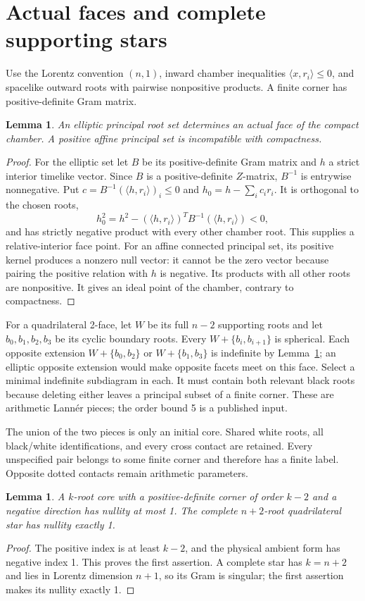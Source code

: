 \documentclass[11pt]{article}
\newtheorem{lemma}[theorem]{Lemma}
\begin{document}
\section{Actual faces and complete supporting stars}
Use the Lorentz convention $(n,1)$, inward chamber inequalities
$\langle x,r_i\rangle\le 0$, and spacelike outward roots with pairwise
nonpositive products. A finite corner has positive-definite Gram matrix.
\begin{lemma}\label{lem:face}
An elliptic principal root set determines an actual face of the compact
chamber. A positive affine principal set is incompatible with compactness.
\end{lemma}
\begin{proof}
For the elliptic set let $B$ be its positive-definite Gram matrix and $h$
a strict interior timelike vector. Since $B$ is a positive-definite
$Z$-matrix, $B^{-1}$ is entrywise nonnegative. Put
$c=B^{-1}(\langle h,r_i\rangle)_i\le 0$ and
$h_0=h-\sum_i c_i r_i$. It is orthogonal to the chosen roots,
\[
 h_0^2=h^2-(\langle h,r_i\rangle)^TB^{-1}
 (\langle h,r_i\rangle)<0,
\]
and has strictly negative product with every other chamber root. This
supplies a relative-interior face point. For an affine connected principal
set, its positive kernel produces a nonzero null vector: it cannot be the
zero vector because pairing the positive relation with $h$ is negative.
Its products with all other roots are nonpositive. It gives an ideal point
of the chamber, contrary to compactness.
\end{proof}

For a quadrilateral 2-face, let $W$ be its full $n-2$ supporting roots and
let $b_0,b_1,b_2,b_3$ be its cyclic boundary roots. Every
$W+\{b_i,b_{i+1}\}$ is spherical. Each opposite extension
$W+\{b_0,b_2\}$ or $W+\{b_1,b_3\}$ is indefinite by
Lemma~\ref{lem:face}; an elliptic opposite extension would make opposite
facets meet on this face. Select a minimal indefinite subdiagram in each.
It must contain both relevant black roots because deleting either leaves
a principal subset of a finite corner. These are arithmetic Lann\'er
pieces; the order bound 5 is a published input.

The union of the two pieces is only an initial core. Shared white roots,
all black/white identifications, and every cross contact are retained.
Every unspecified pair belongs to some finite corner and therefore has a
finite label. Opposite dotted contacts remain arithmetic parameters.

\begin{lemma}\label{lem:rank}
A $k$-root core with a positive-definite corner of order $k-2$ and a
negative direction has nullity at most 1. The complete $n+2$-root
quadrilateral star has nullity exactly 1.
\end{lemma}
\begin{proof}
The positive index is at least $k-2$, and the physical ambient form has
negative index 1. This proves the first assertion. A complete star has
$k=n+2$ and lies in Lorentz dimension $n+1$, so its Gram is singular;
the first assertion makes its nullity exactly 1.
\end{proof}
\end{document}
